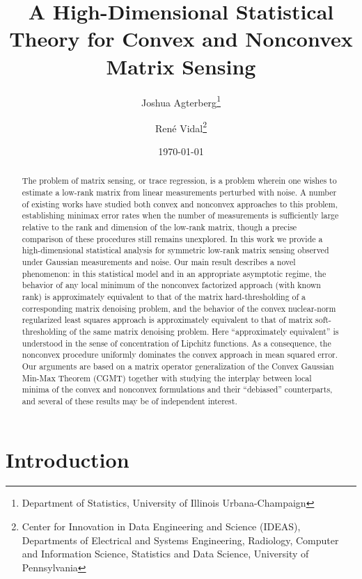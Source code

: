 \documentclass[10pt]{article}
\title{A High-Dimensional Statistical Theory for Convex and Nonconvex Matrix Sensing}
\author{Joshua Agterberg\thanks{Department of Statistics, University of Illinois Urbana-Champaign} \and Ren\'e Vidal\thanks{Center for Innovation in Data Engineering and Science (IDEAS), Departments of Electrical and Systems Engineering, Radiology, Computer and Information Science, Statistics and Data Science, University of Pennsylvania}}
\date{\today}
\theoremstyle{definition}
\begin{document}
\maketitle


\begin{abstract}
The problem of matrix sensing, or trace regression, is a problem wherein one wishes to estimate a low-rank matrix from linear measurements perturbed with noise. A number of existing works have studied both convex and nonconvex approaches to this problem, establishing minimax error rates when the number of measurements is sufficiently large relative to the rank and dimension of the low-rank matrix, though a precise comparison of these procedures still remains unexplored.   
In this work we provide a high-dimensional   statistical analysis for symmetric low-rank matrix sensing observed under Gaussian measurements and noise.  
Our main result describes a novel phenomenon: in this statistical model and in an appropriate asymptotic regime, the behavior of any local minimum of the nonconvex factorized approach (with known rank)  is approximately  equivalent to that of the matrix hard-thresholding of a corresponding matrix denoising problem, and the behavior of the convex nuclear-norm regularized least squares approach is approximately equivalent to that of matrix soft-thresholding of the same matrix denoising problem.  Here ``approximately equivalent'' is understood in the sense of concentration of Lipchitz functions.  As a consequence, the nonconvex procedure uniformly dominates the convex approach in mean squared error. 
 Our arguments are based on a matrix operator generalization of the Convex Gaussian Min-Max Theorem (CGMT) together with studying the interplay between local minima of the convex and  nonconvex formulations and their ``debiased'' counterparts, and several of these results may be of independent interest. 
\end{abstract}

\tableofcontents








\section{Introduction}
\end{document}
